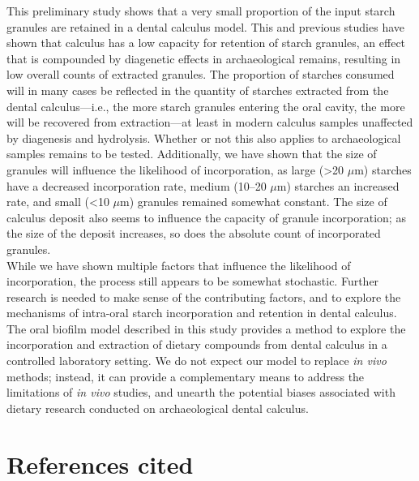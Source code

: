 \documentclass[
  b5paper,
]{book}
\begin{document}
This preliminary study shows that a very small proportion of the input
starch granules are retained in a dental calculus model. This and
previous studies have shown that calculus has a low capacity for
retention of starch granules, an effect that is compounded by diagenetic
effects in archaeological remains, resulting in low overall counts of
extracted granules. The proportion of starches consumed will in many
cases be reflected in the quantity of starches extracted from the dental
calculus---i.e., the more starch granules entering the oral cavity, the
more will be recovered from extraction---at least in modern calculus
samples unaffected by diagenesis and hydrolysis. Whether or not this
also applies to archaeological samples remains to be tested.
Additionally, we have shown that the size of granules will influence the
likelihood of incorporation, as large (\textgreater20 \(\mu\)m) starches
have a decreased incorporation rate, medium (10--20 \(\mu\)m) starches
an increased rate, and small (\textless10 \(\mu\)m) granules remained
somewhat constant. The size of calculus deposit also seems to influence
the capacity of granule incorporation; as the size of the deposit
increases, so does the absolute count of incorporated granules.\\
While we have shown multiple factors that influence the likelihood of
incorporation, the process still appears to be somewhat stochastic.
Further research is needed to make sense of the contributing factors,
and to explore the mechanisms of intra-oral starch incorporation and
retention in dental calculus. The oral biofilm model described in this
study provides a method to explore the incorporation and extraction of
dietary compounds from dental calculus in a controlled laboratory
setting. We do not expect our model to replace \emph{in vivo} methods;
instead, it can provide a complementary means to address the limitations
of \emph{in vivo} studies, and unearth the potential biases associated
with dietary research conducted on archaeological dental calculus.

\section*{References cited}\label{references-cited-3}

\end{document}
